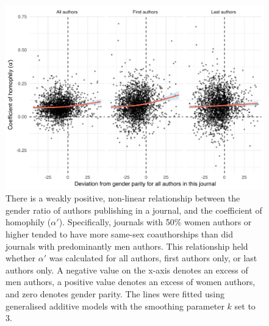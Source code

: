 \documentclass[12pt,]{article}
\begin{document}
\begin{figure}
\centering
\includegraphics{../figures/figure3.pdf}
\caption{There is a weakly positive, non-linear relationship between the
gender ratio of authors publishing in a journal, and the coefficient of
homophily (\(\alpha'\)). Specifically, journals with 50\% women authors
or higher tended to have more same-sex coauthorships than did journals
with predominantly men authors. This relationship held whether
\(\alpha'\) was calculated for all authors, first authors only, or last
authors only. A negative value on the x-axis denotes an excess of men
authors, a positive value denotes an excess of women authors, and zero
denotes gender parity. The lines were fitted using generalised additive
models with the smoothing parameter \(k\) set to 3.
\label{alpha_gender_ratio}}
\end{figure}

\newpage
\end{document}
